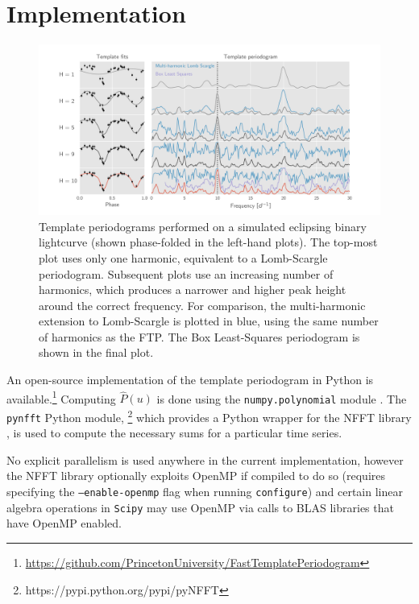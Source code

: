 \documentclass[iop]{emulateapj}
\begin{document}
\section{Implementation}\label{sec:implementation}

\begin{figure}
    \centering
    \includegraphics[width=\textwidth]{plots/templates_and_periodograms.png}
    \caption{\label{fig:tempsandpdgs} Template periodograms performed on a simulated eclipsing
            binary lightcurve (shown phase-folded in the left-hand plots). The top-most plot 
            uses only one harmonic, equivalent to a Lomb-Scargle periodogram. Subsequent plots
            use an increasing number of harmonics, which produces a narrower and higher peak
            height around the correct frequency. For comparison, the multi-harmonic extension 
            to Lomb-Scargle is plotted in blue, using the same number of harmonics as the FTP.
            The Box Least-Squares \citep{Kovacs_2002} periodogram is shown in the final plot.}
\end{figure}

An open-source implementation of the template periodogram in Python is
available.\footnote{\url{https://github.com/PrincetonUniversity/FastTemplatePeriodogram}} 
Computing $\hat{P}(u)$ is done using the \texttt{numpy.polynomial} module 
\citep{Scipy}. The \texttt{pynfft} Python module,
\footnote{https://pypi.python.org/pypi/pyNFFT} which provides a Python 
wrapper for the NFFT library \citep{NFFT}, is used to compute the necessary 
sums for a particular time series.

No explicit parallelism is used anywhere in the current implementation, 
however the NFFT library optionally exploits OpenMP if compiled
to do so (requires specifying the \texttt{--enable-openmp} flag
when running \texttt{configure}) and certain linear algebra operations
in \texttt{Scipy} may use OpenMP via calls to BLAS libraries that
have OpenMP enabled.
\end{document}
